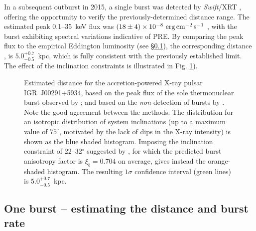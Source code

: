 \documentclass{aastex63}
\newcommand{\epcs}{{\rm erg\,cm^{-2}\,s^{-1}}}
\begin{document}
%
In a subsequent outburst in 2015, a single burst was detected by {\it Swift}/XRT \cite[]{kuin15}, offering the opportunity to verify the previously-determined distance range. The estimated peak 
0.1--35~keV flux was $(18\pm4)\times10^{-8}\ \epcs$ \cite[]{defalco17}, with the burst exhibiting spectral variations indicative of PRE. By comparing the peak flux to the empirical Eddington luminosity (see \S\ref{subsec:1burst}), the corresponding distance 
\cite[including the inclination range of 22--32$^\circ$ suggested by][]{torres08},
is $5.0_{-0.5}^{+0.7}$~kpc, which is fully consistent with the previously established limit. The effect of the inclination constraints is illustrated in Fig. \ref{fig:dist_igr00291}).

\begin{figure}[ht!]
\caption{Estimated distance for the accretion-powered X-ray pulsar IGR~J00291+5934, based on the peak flux of the sole thermonuclear burst observed by \citet[][solid histograms]{defalco17};
%
and based on the {\it non-}detection of bursts by \citet[][red dashed lines]{gal06b}.
%
Note the good agreement between the methods.
%
The distribution for an isotropic distribution of system inclinations (up to a maximum value of $75^\circ$, motivated by the lack of dips in the X-ray intensity) is shown as the blue shaded histogram. Imposing the inclination constraint of 22--32$^\circ$ suggested by \cite{torres08}, for which the predicted burst anisotropy factor is $\xi_b=0.704$ on average, gives instead the orange-shaded histogram. The resulting $1\sigma$ confidence interval (green lines) is $5.0_{-0.5}^{+0.7}$~kpc.
\label{fig:dist_igr00291}}
\end{figure}


\subsection{One burst -- estimating the distance and burst rate} 
\label{subsec:1burst}
\end{document}
